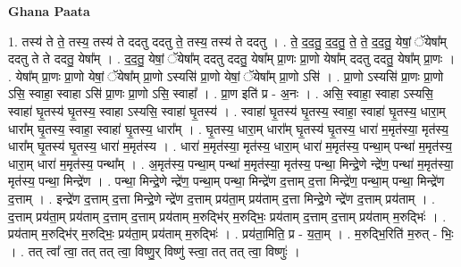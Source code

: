 \documentclass[17pt]{extarticle}
\begin{document}
\textbf{Ghana Paata } \newline

1. तस्य॑ ते ते॒ तस्य॒ तस्य॑ ते ददतु ददतु ते॒ तस्य॒ तस्य॑ ते ददतु । . ते॒ द॒द॒तु॒ द॒द॒तु॒ ते॒ ते॒ द॒द॒तु॒ येषां॒ ॅयेषा᳚म् ददतु ते ते ददतु॒ येषा᳚म् । . द॒द॒तु॒ येषां॒ ॅयेषा᳚म् ददतु ददतु॒ येषा᳚म् प्रा॒णः प्रा॒णो येषा᳚म् ददतु ददतु॒ येषा᳚म् प्रा॒णः । . येषा᳚म् प्रा॒णः प्रा॒णो येषां॒ ॅयेषा᳚म् प्रा॒णो ऽस्यसि॑ प्रा॒णो येषां॒ ॅयेषा᳚म् प्रा॒णो ऽसि॑ । . प्रा॒णो ऽस्यसि॑ प्रा॒णः प्रा॒णो ऽसि॒ स्वाहा॒ स्वाहा ऽसि॑ प्रा॒णः प्रा॒णो ऽसि॒ स्वाहा᳚ । . प्रा॒ण इति॑ प्र - अ॒नः । . असि॒ स्वाहा॒ स्वाहा ऽस्यसि॒ स्वाहा॑ घृ॒तस्य॑ घृ॒तस्य॒ स्वाहा ऽस्यसि॒ स्वाहा॑ घृ॒तस्य॑ । . स्वाहा॑ घृ॒तस्य॑ घृ॒तस्य॒ स्वाहा॒ स्वाहा॑ घृ॒तस्य॒ धारा॒म् धारा᳚म् घृ॒तस्य॒ स्वाहा॒ स्वाहा॑ घृ॒तस्य॒ धारा᳚म् । . घृ॒तस्य॒ धारा॒म् धारा᳚म् घृ॒तस्य॑ घृ॒तस्य॒ धारा॑ म॒मृत॑स्या॒ मृत॑स्य॒ धारा᳚म् घृ॒तस्य॑ घृ॒तस्य॒ धारा॑ म॒मृत॑स्य । . धारा॑ म॒मृत॑स्या॒ मृत॑स्य॒ धारा॒म् धारा॑ म॒मृत॑स्य॒ पन्था॒म् पन्था॑ म॒मृत॑स्य॒ धारा॒म् धारा॑ म॒मृत॑स्य॒ पन्था᳚म् । . अ॒मृत॑स्य॒ पन्था॒म् पन्था॑ म॒मृत॑स्या॒ मृत॑स्य॒ पन्था॒ मिन्द्रे॒णे न्द्रे॑ण॒ पन्था॑ म॒मृत॑स्या॒ मृत॑स्य॒ पन्था॒ मिन्द्रे॑ण । . पन्था॒ मिन्द्रे॒णे न्द्रे॑ण॒ पन्था॒म् पन्था॒ मिन्द्रे॑ण द॒त्ताम् द॒त्ता मिन्द्रे॑ण॒ पन्था॒म् पन्था॒ मिन्द्रे॑ण द॒त्ताम् । . इन्द्रे॑ण द॒त्ताम् द॒त्ता मिन्द्रे॒णे न्द्रे॑ण द॒त्ताम् प्रय॑ता॒म् प्रय॑ताम् द॒त्ता मिन्द्रे॒णे न्द्रे॑ण द॒त्ताम् प्रय॑ताम् । . द॒त्ताम् प्रय॑ता॒म् प्रय॑ताम् द॒त्ताम् द॒त्ताम् प्रय॑ताम् म॒रुद्भि॑र् म॒रुद्भिः॒ प्रय॑ताम् द॒त्ताम् द॒त्ताम् प्रय॑ताम् म॒रुद्भिः॑ । . प्रय॑ताम् म॒रुद्भि॑र् म॒रुद्भिः॒ प्रय॑ता॒म् प्रय॑ताम् म॒रुद्भिः॑ । . प्रय॑ता॒मिति॒ प्र - य॒ता॒म् । . म॒रुद्भि॒रिति॑ म॒रुत् - भिः॒ । . तत् त्वा᳚ त्वा॒ तत् तत् त्वा॒ विष्णु॒र् विष्णु॑ स्त्वा॒ तत् तत् त्वा॒ विष्णुः॑ । \newline
\end{document}
